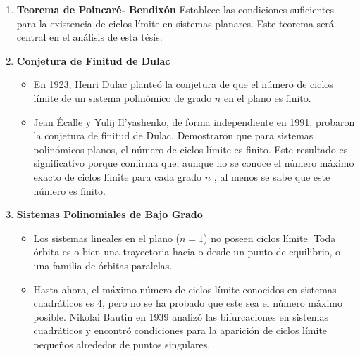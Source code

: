 \documentclass[12pt, a4paper]{report}
\begin{document}
\begin{enumerate}
	\item \textbf{Teorema de Poincaré- Bendixón} Establece las condiciones suficientes para la existencia de ciclos límite en sistemas planares. Este teorema será central en el análisis de esta tésis.
	
	\item \textbf{Conjetura de Finitud de Dulac}
	\begin{itemize}
		\item 	En 1923, Henri Dulac planteó la conjetura de que el número de ciclos límite de un sistema polinómico de grado $n$  en el plano es finito. 
		\item Jean Écalle y Yulij Il'yashenko, de forma independiente en 1991, probaron la conjetura de finitud de Dulac. Demostraron que para sistemas polinómicos planos, el número de ciclos límite es finito. Este resultado es significativo porque confirma que, aunque no se conoce el número máximo exacto de ciclos límite para cada grado $n$
		, al menos se sabe que este número es finito.
	\end{itemize}

	\item \textbf{Sistemas Polinomiales de Bajo Grado}
	\begin{itemize}
		\item 	Los sistemas lineales en el plano ($n=1$) no poseen ciclos límite. Toda órbita es o bien una trayectoria hacia o desde un punto de equilibrio, o una familia de órbitas paralelas.

		\item Hasta ahora, el máximo número de ciclos límite conocidos en sistemas cuadráticos es $4$, pero no se ha probado que este sea el número máximo posible. Nikolai Bautin en 1939 analizó las bifurcaciones en sistemas cuadráticos y encontró condiciones para la aparición de ciclos límite pequeños alrededor de puntos singulares.
	\end{itemize}


\end{enumerate}
\end{document}
